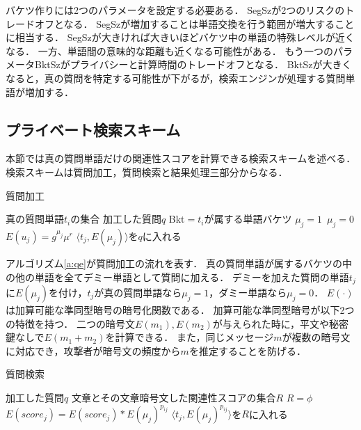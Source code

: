 \documentclass[master]{suribt}
\theoremstyle{definition}
\begin{document}
 バケツ作りには2つのパラメータを設定する必要ある．
 SegSzが2つのリスクのトレードオフとなる．
 SegSzが増加することは単語交換を行う範囲が増大することに相当する．
 SegSzが大きければ大きいほどバケツ中の単語の特殊レベルが近くなる．
 一方、単語間の意味的な距離も近くなる可能性がある．
 もう一つのパラメータBktSzがプライバシーと計算時間のトレードオフとなる．
 BktSzが大きくなると，真の質問を特定する可能性が下がるが，検索エンジンが処理する質問単語が増加する．
 
 \subsection{プライベート検索スキーム}
 本節では真の質問単語だけの関連性スコアを計算できる検索スキームを述べる．
 検索スキームは質問加工，質問検索と結果処理三部分からなる．

 \begin{algorithm}
 \caption{質問加工}
 \begin{algorithmic}[1]
  \Require 真の質問単語$t_i$の集合
  \Ensure 加工した質問$q$
   \State Bkt$=t_i$が属する単語バケツ
     $\mu_j=1$
    \Else $\,\mu_j=0$
    \EndIf
    \State $E(u_j) = g^{\mu_j}\mu^r$
    \State $\langle t_j,E(\mu_j)\rangle$を$q$に入れる
   \EndFor
  \EndFor
 \EndFunction
 \end{algorithmic}
 \label{a:qe}
 \end{algorithm}

 アルゴリズム\ref{a:qe}が質問加工の流れを表す．
 真の質問単語が属するバケツの中の他の単語を全てデミー単語として質問に加える．
 デミーを加えた質問の単語$t_j$に$E(\mu_j)$を付け，$t_j$が真の質問単語なら$\mu_j=1$，ダミー単語なら$\mu_j=0$．
 $E(\cdot)$は加算可能な準同型暗号\cite{benaloh_dense_1994}の暗号化関数である．
 加算可能な準同型暗号が以下2つの特徴を持つ．
 二つの暗号文$E(m_1), E(m_2)$が与えられた時に，平文や秘密鍵なしで$E( m_1 + m_2 )$を計算できる．
 また，同じメッセージ$m$が複数の暗号文に対応でき，攻撃者が暗号文の頻度から$m$を推定することを防げる．

 \begin{algorithm}
 \caption{質問検索}
 \begin{algorithmic}[1]
  \Require 加工した質問$q$
  \Ensure 文章とその文章暗号文した関連性スコアの集合$R$
  \State $R=\phi$
     \State $E(score_j)=E(score_j)*E(\mu_j)^{p_{ij}}$
    \Else
     \State $\langle t_j,E(\mu_j)^{p_{ij}}\rangle$を$R$に入れる
    \EndIf
   \EndFor
  \EndFor
 \EndFunction
 \end{algorithmic}
 \label{a:qs}
 \end{algorithm}
\end{document}
